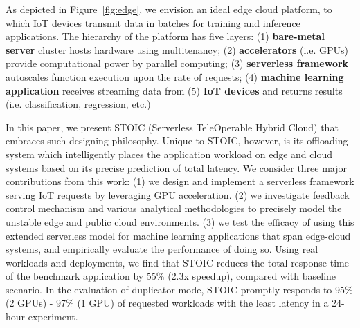 As depicted in Figure~\ref{fig:edge}, we envision an ideal edge cloud platform, to which IoT devices transmit data in batches for training and inference applications. The hierarchy of the platform has five layers: (1) \textbf{bare-metal server} cluster hosts hardware using multitenancy; (2) \textbf{accelerators} (i.e. GPUs) provide computational power by parallel computing; (3) \textbf{serverless framework} autoscales function execution upon the rate of requests; (4) \textbf{machine learning application} receives streaming data from (5) \textbf{IoT devices} and returns results (i.e. classification, regression, etc.)

In this paper, we present STOIC (Serverless TeleOperable Hybrid Cloud) that embraces such designing philosophy. Unique to STOIC, however, is its offloading system which intelligently places the application workload on edge and cloud systems based on its precise prediction of total latency. We consider three major contributions from this work: (1) we design and implement a serverless framework serving IoT requests by leveraging GPU acceleration. (2) we investigate feedback control mechanism and various analytical methodologies to precisely model the unstable edge and public cloud environments. (3) we test the efficacy of using this extended serverless model for machine learning applications that span edge-cloud systems, and empirically evaluate the performance of doing so. Using real workloads and deployments, we find that STOIC reduces the total response time of the benchmark application by 55\% (2.3x speedup), compared with baseline scenario. In the evaluation of duplicator mode, STOIC promptly responds to 95\% (2 GPUs) - 97\% (1 GPU) of requested workloads with the least latency in a 24-hour experiment. 
\fi

